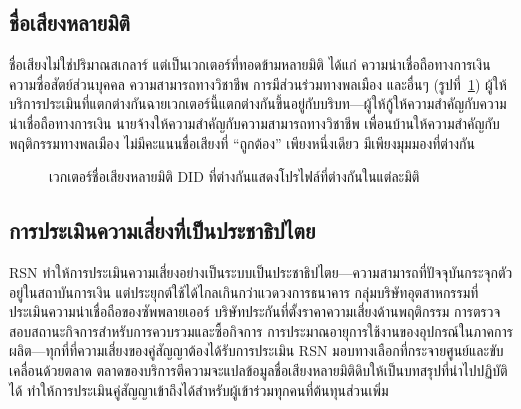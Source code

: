 \documentclass[11pt,a4paper,twocolumn]{article}
\begin{document}
\subsection{ชื่อเสียงหลายมิติ}

ชื่อเสียงไม่ใช่ปริมาณสเกลาร์ แต่เป็นเวกเตอร์ที่ทอดข้ามหลายมิติ ได้แก่ ความน่าเชื่อถือทางการเงิน ความซื่อสัตย์ส่วนบุคคล ความสามารถทางวิชาชีพ การมีส่วนร่วมทางพลเมือง และอื่นๆ (รูปที่~\ref{fig:reputation-radar}) ผู้ให้บริการประเมินที่แตกต่างกันฉายเวกเตอร์นี้แตกต่างกันขึ้นอยู่กับบริบท---ผู้ให้กู้ให้ความสำคัญกับความน่าเชื่อถือทางการเงิน นายจ้างให้ความสำคัญกับความสามารถทางวิชาชีพ เพื่อนบ้านให้ความสำคัญกับพฤติกรรมทางพลเมือง ไม่มีคะแนนชื่อเสียงที่ ``ถูกต้อง'' เพียงหนึ่งเดียว มีเพียงมุมมองที่ต่างกัน

\begin{figure}[ht]
\centering
{}
\caption{เวกเตอร์ชื่อเสียงหลายมิติ DID ที่ต่างกันแสดงโปรไฟล์ที่ต่างกันในแต่ละมิติ}
\label{fig:reputation-radar}
\end{figure}

\subsection{การประเมินความเสี่ยงที่เป็นประชาธิปไตย}

RSN ทำให้การประเมินความเสี่ยงอย่างเป็นระบบเป็นประชาธิปไตย---ความสามารถที่ปัจจุบันกระจุกตัวอยู่ในสถาบันการเงิน แต่ประยุกต์ใช้ได้ไกลเกินกว่าแวดวงการธนาคาร กลุ่มบริษัทอุตสาหกรรมที่ประเมินความน่าเชื่อถือของซัพพลายเออร์ บริษัทประกันที่ตั้งราคาความเสี่ยงด้านพฤติกรรม การตรวจสอบสถานะกิจการสำหรับการควบรวมและซื้อกิจการ การประมาณอายุการใช้งานของอุปกรณ์ในภาคการผลิต---ทุกที่ที่ความเสี่ยงของคู่สัญญาต้องได้รับการประเมิน RSN มอบทางเลือกที่กระจายศูนย์และขับเคลื่อนด้วยตลาด ตลาดของบริการตีความจะแปลข้อมูลชื่อเสียงหลายมิติดิบให้เป็นบทสรุปที่นำไปปฏิบัติได้ ทำให้การประเมินคู่สัญญาเข้าถึงได้สำหรับผู้เข้าร่วมทุกคนที่ต้นทุนส่วนเพิ่ม

\end{document}
